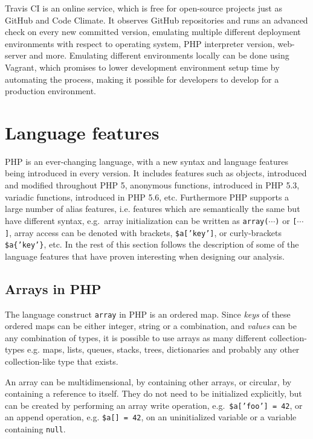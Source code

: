 Travis CI is an online service, which is free for open-source projects just as GitHub and Code Climate. It observes GitHub repositories and runs an advanced check on every new committed version, emulating multiple different deployment environments with respect to operating system, PHP interpreter version, web-server and more. Emulating different environments locally can be done using Vagrant, which promises to lower development environment setup time by automating the process, making it possible for developers to develop for a production environment.


\section{Language features}
PHP is an ever-changing language, with a new syntax and language features being introduced in every version. It includes features such as objects, introduced and modified throughout PHP 5, anonymous functions, introduced in PHP 5.3, variadic functions, introduced in PHP 5.6, etc. Furthermore PHP supports a large number of alias features, i.e. features which are semantically the same but have different syntax, e.g.\ array initialization can be written as \texttt{array($\cdots$)} or \texttt{[$\cdots$]}, array access can be denoted with brackets, \texttt{\$a['key']}, or curly-brackets \texttt{\$a\{'key'\}}, etc. In the rest of this section follows the description of some of the language features that have proven interesting when designing our analysis.

\subsection{Arrays in PHP}
The language construct \texttt{array} in PHP is an ordered map. Since \emph{keys} of these ordered maps can be either integer, string or a combination, and \emph{values} can be any combination of types, it is possible to use arrays as many different collection-types e.g. maps, lists, queues, stacks, trees, dictionaries and probably any other collection-like type that exists. 

An array can be multidimensional, by containing other arrays, or circular, by containing a reference to itself. They do not need to be initialized explicitly, but can be created by performing an array write operation, e.g.\ \texttt{\$a['foo'] = 42}, or an append operation, e.g. \texttt{\$a[] = 42}, on an uninitialized variable or a variable containing \texttt{null}.

